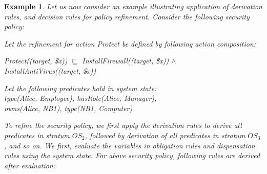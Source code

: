 \documentclass[12pt,journal,letterpaper,onecolumn]{IEEEtran}
\newtheorem{example}{Example}[section]
\begin{document}
\begin{example} Let us now consider an example illustrating
application of derivation rules, and decision rules for policy
refinement. Consider the following security policy:




\noindent Let the refinement for action {\ttfamily Protect} be
defined by following action composition:

{\ttfamily  Protect((target, \$x)) $\sqsubseteq$
 InstallFirewall((target, \$x)) $\wedge$ \\
 \indent\indent\indent\indent InstallAntiVirus((target, \$x))}

\noindent
Let the following predicates hold in system state:\\
{\ttfamily type(Alice, Employee), hasRole(Alice, Manager), \\
 owns(Alice, NB1), type(NB1, Computer)}

To refine the security policy, we first apply the derivation rules to
derive all predicates in stratum $OS_2$, followed by derivation of
all predicates in stratum $OS_3$, and so on. We first, evaluate the
variables in obligation rules and dispensation rules using the
system state. For above security policy, following rules are
derived after evaluation:




\end{example}
\end{document}
